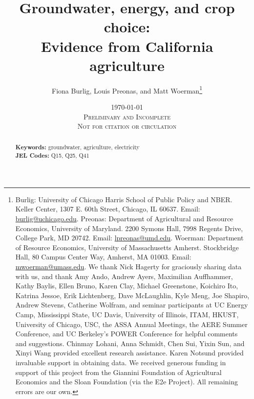 \documentclass[hidelinks,12pt]{article}
\title{\vspace{-10mm} {Groundwater, energy, and crop choice: \\Evidence from California agriculture}
}
\date{\today\\ \vspace{0.3cm} \textsc{Preliminary and Incomplete \\ Not for citation or circulation}
}
\author{
Fiona Burlig, Louis Preonas, and Matt Woerman\thanks{\scriptsize Burlig: University of Chicago Harris School of Public Policy and NBER. Keller Center, 1307 E. 60th Street, Chicago, IL 60637. Email: \url{burlig@uchicago.edu}. Preonas: Department of Agricultural and Resource Economics, University of Maryland. 2200 Symons Hall, 7998 Regents Drive, College Park, MD 20742. Email: \url{lpreonas@umd.edu}. Woerman: Department of Resource Economics, University of Massachusetts Amherst. Stockbridge Hall, 80 Campus Center Way, Amherst, MA 01003. Email: \url{mwoerman@umass.edu}. 
%
We thank Nick Hagerty for graciously sharing data with us, and thank Amy Ando, Andrew Ayers, Maximilian Auffhammer, Kathy Baylis, Ellen Bruno, Karen Clay, Michael Greenstone, Koichiro Ito, Katrina Jessoe, Erik Lichtenberg, Dave McLaughlin, Kyle Meng, Joe Shapiro, Andrew Stevens, Catherine Wolfram, and seminar participants at UC Energy Camp, Mississippi State, UC Davis, University of Illinois, ITAM, HKUST, University of Chicago, USC, the ASSA Annual Meetings, the AERE Summer Conference, and UC Berkeley's POWER Conference for helpful comments and suggestions.
%
Chinmay Lohani, Anna Schmidt, Chen Sui, Yixin Sun, and Xinyi Wang provided excellent research assistance.
%
Karen Notsund provided invaluable support in obtaining data. 
%
We received generous funding in support of this project from the Giannini Foundation of Agricultural Economics and the Sloan Foundation (via the E2e Project).
%
All remaining errors are our own.}}
\begin{document}
\setlength{\parindent}{0.9cm}
\maketitle
\thispagestyle{empty}
\normalsize
\begin{abstract}
\vspace{-2mm}
\noindent \newline


\noindent \textbf{Keywords:} groundwater, agriculture, electricity \\
\noindent \textbf{JEL Codes:} Q15, Q25, Q41 \\
 

\end{abstract}
\vspace{5mm}
\end{document}
